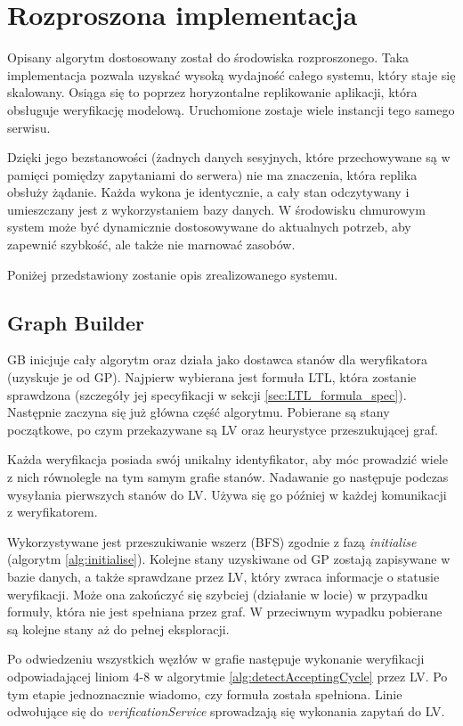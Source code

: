 \chapter{Rozproszona implementacja}

Opisany algorytm dostosowany został do środowiska rozproszonego.
Taka implementacja pozwala uzyskać wysoką wydajność całego systemu, który staje się skalowany.
Osiąga się to poprzez horyzontalne replikowanie aplikacji, która obsługuje weryfikację modelową.
Uruchomione zostaje wiele instancji tego samego serwisu.

Dzięki jego bezstanowości (żadnych danych sesyjnych, które przechowywane są w pamięci pomiędzy zapytaniami do serwera) nie ma znaczenia, która replika obsłuży żądanie.
Każda wykona je identycznie, a cały stan odczytywany i umieszczany jest z wykorzystaniem bazy danych.
W środowisku chmurowym system może być dynamicznie dostosowywane do aktualnych potrzeb, aby zapewnić szybkość, ale także nie marnować zasobów.

Poniżej przedstawiony zostanie opis zrealizowanego systemu.


\section{Graph Builder}

GB inicjuje cały algorytm oraz działa jako dostawca stanów dla weryfikatora (uzyskuje je od GP).
Najpierw wybierana jest formuła LTL, która zostanie sprawdzona (szczegóły jej specyfikacji w sekcji \ref{sec:LTL_formula_spec}).
Następnie zaczyna się już główna część algorytmu.
Pobierane są stany początkowe, po czym przekazywane są LV oraz heurystyce przeszukującej graf.

Każda weryfikacja posiada swój unikalny identyfikator, aby móc prowadzić wiele z nich równolegle na tym samym grafie stanów.
Nadawanie go następuje podczas wysyłania pierwszych stanów do LV.
Używa się go później w każdej komunikacji z weryfikatorem.

Wykorzystywane jest przeszukiwanie wszerz (BFS) zgodnie z fazą \textit{initialise} (algorytm \ref{alg:initialise}).
Kolejne stany uzyskiwane od GP zostają zapisywane w bazie danych, a także sprawdzane przez LV, który zwraca informacje o statusie weryfikacji.
Może ona zakończyć się szybciej (działanie w locie) w przypadku formuły, która nie jest spełniana przez graf.
W przeciwnym wypadku pobierane są kolejne stany aż do pełnej eksploracji.

Po odwiedzeniu wszystkich węzłów w grafie następuje wykonanie weryfikacji odpowiadającej liniom 4-8 w algorytmie \ref{alg:detectAcceptingCycle} przez LV.
Po tym etapie jednoznacznie wiadomo, czy formuła została spełniona.
Linie odwołujące się do \textit{verificationService} sprowadzają się wykonania zapytań do LV.

